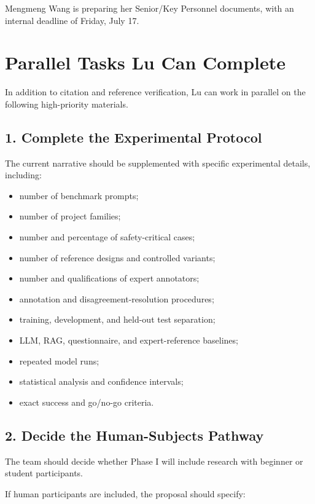 \documentclass[11pt,letterpaper]{article}
\begin{document}
Mengmeng Wang is preparing her Senior/Key Personnel documents, with an
internal deadline of Friday, July 17.

\section{Parallel Tasks Lu Can Complete}

In addition to citation and reference verification, Lu can work in parallel on
the following high-priority materials.

\subsection{1. Complete the Experimental Protocol}

The current narrative should be supplemented with specific experimental
details, including:

\begin{itemize}[leftmargin=0.25in]
    \item number of benchmark prompts;
    \item number of project families;
    \item number and percentage of safety-critical cases;
    \item number of reference designs and controlled variants;
    \item number and qualifications of expert annotators;
    \item annotation and disagreement-resolution procedures;
    \item training, development, and held-out test separation;
    \item LLM, RAG, questionnaire, and expert-reference baselines;
    \item repeated model runs;
    \item statistical analysis and confidence intervals;
    \item exact success and go/no-go criteria.
\end{itemize}

\subsection{2. Decide the Human-Subjects Pathway}

The team should decide whether Phase I will include research with beginner or
student participants.

If human participants are included, the proposal should specify:
\end{document}
